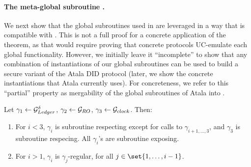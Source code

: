 \paragraph{The meta-global subroutine \gAtala.} %
We next show that the global subroutines used in \RealPKIDIDAtala are leveraged
in a way that is compatible with \cite[Theorem 4.3]{bhz21}. This is not a full
proof for a concrete application of the theorem, as that would require proving
that concrete protocols UC-emulate each global functionality. However, we
initially leave it ``incomplete'' to show that any combination of instantiations
of our global subroutines can be used to build a secure variant of the Atala
DID protocol (later, we show the concrete instantiations that Atala currently
uses). For concreteness, we refer to this ``partial'' property as mergability
of the global subroutines of Atala into \gAtala.

\begin{lemma}
  \label{lma:gAtala}

  Let $\gamma_1 \gets \mathcal{G}_{Ledger}^\delta$, $\gamma_2 \gets \mathcal{G}_{RO}$, $\gamma_3
  \gets \mathcal{G}_{clock}$. Then:
  
  \begin{enumerate}
  \item For $i < 3$, $\gamma_i$ is subroutine respecting except for calls to
    $\gamma_{i+1,\dots,3}$, and $\gamma_3$ is subroutine respecing. All
    $\gamma_i$'s are subroutine exposing.
  \item For $i>1$, $\gamma_i$ is $\gamma_j$-regular, for all $j \in \set{1,
      \dots,i-1}$.
  \end{enumerate}
  
\end{lemma}

